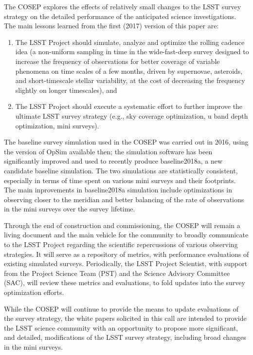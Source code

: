 \documentclass[DM,lsstdraft,toc,usenatbib]{lsstdoc}
\begin{document}
The COSEP explores the effects of relatively small changes to the LSST survey strategy
on the detailed performance of the anticipated science investigations. The main lessons 
learned from the first (2017) version of this paper are: 
\begin{enumerate} 
\item The LSST Project should simulate, analyze and optimize the rolling cadence idea
(a non-uniform sampling in time in the wide-fast-deep survey designed to increase the frequency of 
observations for better coverage of variable phenomena on time scales of a few months, driven 
by supernovae, asteroids, and short-timescale stellar variability, at the cost of decreasing the 
frequency slightly on longer timescales), and 
\item The LSST Project should execute a systematic effort to further improve the ultimate
LSST survey strategy (e.g., sky coverage optimization, u band depth optimization, mini surveys). 
\end{enumerate} 
The baseline survey simulation used in the COSEP was carried out in 2016, using the version of
OpSim available then; the simulation software has been significantly improved and used to recently
produce baseline2018a, a new candidate baseline simulation. The two simulations are statistically consistent,
especially in terms of time spent on various mini surveys and their footprints. The main inprovements
in baseline2018a simulation include optimizations in observing closer to the meridian and better 
balancing of the rate of observations in the mini surveys over the survey lifetime.

Through the end of construction and commissioning, the COSEP will remain a living document 
and the main vehicle for the community to broadly communicate to the LSST Project regarding 
the scientific repercussions of various observing strategies. It will serve as a repository
of metrics, with performance evaluations of existing simulated surveys. Periodically, the LSST
Project Scientist, with support from the Project Science Team (PST) and the Science Advisory Committee (SAC), 
will review these metrics and evaluations, to fold updates into the survey optimization efforts.

While the COSEP will continue to provide the means to update evaluations of the survey strategy, the white 
papers solicited in this call are intended to provide the LSST science community with an opportunity 
to propose more significant, and detailed, modifications of the LSST survey strategy, including broad changes in
the mini surveys.
\end{document}
